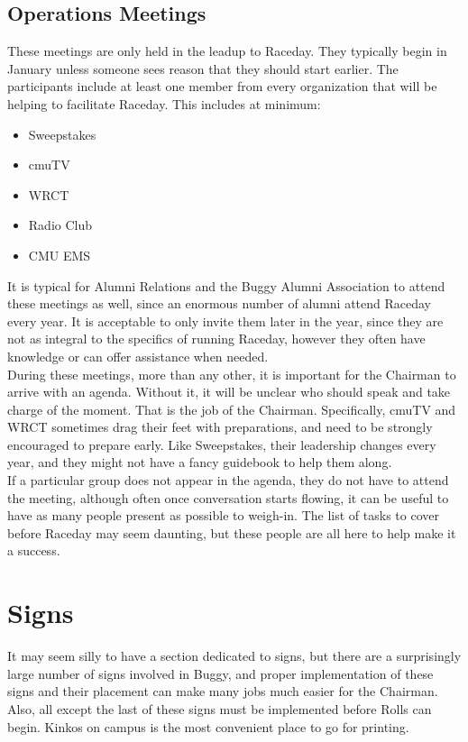 \subsection{Operations Meetings}
These meetings are only held in the leadup to Raceday. They typically begin
in January unless someone sees reason that they should start earlier. The
participants include at least one member from every organization that will
be helping to facilitate Raceday. This includes at minimum:
\begin{itemize}
\item Sweepstakes
\item cmuTV
\item WRCT
\item Radio Club
\item CMU EMS
\end{itemize}

It is typical for Alumni Relations and the Buggy Alumni Association to attend
these meetings as well, since an enormous number of alumni attend Raceday
every year. It is acceptable to only invite them later in the year, since
they are not as integral to the specifics of running Raceday, however they
often have knowledge or can offer assistance when needed.
\\
During these meetings, more than any other, it is important for the Chairman
to arrive with an agenda. Without it, it will be unclear who should speak and
take charge of the moment. That is the job of the Chairman. Specifically, cmuTV
and WRCT sometimes drag their feet with preparations, and need to be strongly
encouraged to prepare early. Like Sweepstakes, their leadership changes every
year, and they might not have a fancy guidebook to help them along.
\\
If a particular group does not appear in the
agenda, they do not have to attend the meeting, although often once
conversation starts flowing, it can be useful to have as many people
present as possible to weigh-in. The list of tasks to cover before Raceday
may seem daunting, but these people are all here to help make it a success.


\section{Signs}
\label{sec:Signs}
It may seem silly to have a section dedicated to signs, but there are a
surprisingly large number of signs involved in Buggy, and proper implementation
of these signs and their placement can make many jobs much easier for the
Chairman. Also, all except the last of these signs must be implemented before
Rolls can begin. Kinkos on campus is the most convenient place to go for
printing.

